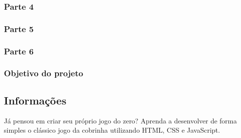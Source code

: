 \documentclass[12pt,a4paper]{article}
\begin{document}
	\subsubsection{Parte 4}
	
	\subsubsection{Parte 5}
	
	\subsubsection{Parte 6}
	
	\subsubsection{Objetivo do projeto}
	
	\subsection{Informações}
	
	Já pensou em criar seu próprio jogo do zero? Aprenda a desenvolver de forma simples o clássico jogo da cobrinha utilizando HTML, CSS e JavaScript.
	
\end{document}
